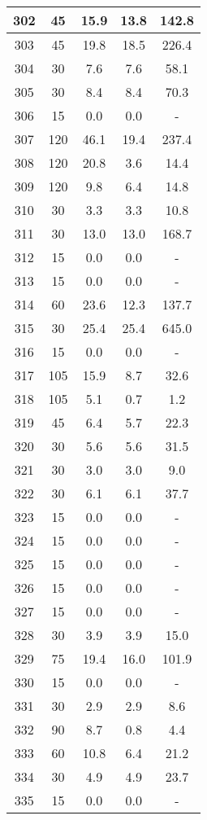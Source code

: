 \documentclass[a4paper,10pt]{article}
\begin{document}
\begin{table}
\begin{tabular}{|c|c|c|c|c|}
\hline
302 & 45 & 15.9 & 13.8 & 142.8 \\
\hline
303 & 45 & 19.8 & 18.5 & 226.4 \\
\hline
304 & 30 & 7.6 & 7.6 & 58.1 \\
\hline
305 & 30 & 8.4 & 8.4 & 70.3 \\
\hline
306 & 15 & 0.0 & 0.0 & - \\
\hline
307 & 120 & 46.1 & 19.4 & 237.4 \\
\hline
308 & 120 & 20.8 & 3.6 & 14.4 \\
\hline
309 & 120 & 9.8 & 6.4 & 14.8 \\
\hline
310 & 30 & 3.3 & 3.3 & 10.8 \\
\hline
311 & 30 & 13.0 & 13.0 & 168.7 \\
\hline
312 & 15 & 0.0 & 0.0 & - \\
\hline
313 & 15 & 0.0 & 0.0 & - \\
\hline
314 & 60 & 23.6 & 12.3 & 137.7 \\
\hline
315 & 30 & 25.4 & 25.4 & 645.0 \\
\hline
316 & 15 & 0.0 & 0.0 & - \\
\hline
317 & 105 & 15.9 & 8.7 & 32.6 \\
\hline
318 & 105 & 5.1 & 0.7 & 1.2 \\
\hline
319 & 45 & 6.4 & 5.7 & 22.3 \\
\hline
320 & 30 & 5.6 & 5.6 & 31.5 \\
\hline
321 & 30 & 3.0 & 3.0 & 9.0 \\
\hline
322 & 30 & 6.1 & 6.1 & 37.7 \\
\hline
323 & 15 & 0.0 & 0.0 & - \\
\hline
324 & 15 & 0.0 & 0.0 & - \\
\hline
325 & 15 & 0.0 & 0.0 & - \\
\hline
326 & 15 & 0.0 & 0.0 & - \\
\hline
327 & 15 & 0.0 & 0.0 & - \\
\hline
328 & 30 & 3.9 & 3.9 & 15.0 \\
\hline
329 & 75 & 19.4 & 16.0 & 101.9 \\
\hline
330 & 15 & 0.0 & 0.0 & - \\
\hline
331 & 30 & 2.9 & 2.9 & 8.6 \\
\hline
332 & 90 & 8.7 & 0.8 & 4.4 \\
\hline
333 & 60 & 10.8 & 6.4 & 21.2 \\
\hline
334 & 30 & 4.9 & 4.9 & 23.7 \\
\hline
335 & 15 & 0.0 & 0.0 & - \\

\end{tabular}
\end{table}
\end{document}

